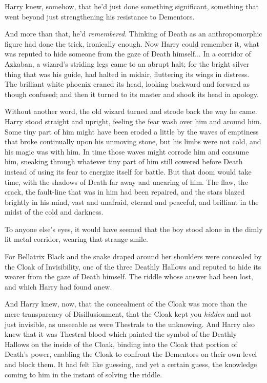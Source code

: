 Harry knew, somehow, that he’d just done something significant, something that went beyond just strengthening his resistance to Dementors.

And more than that, he’d \emph{remembered}. Thinking of Death as an anthropomorphic figure had done the trick, ironically enough. Now Harry could remember it, what was reputed to hide someone from the gaze of Death himself...
\sbreak
In a corridor of Azkaban, a wizard’s striding legs came to an abrupt halt; for the bright silver thing that was his guide, had halted in midair, fluttering its wings in distress. The brilliant white phoenix craned its head, looking backward and forward as though confused; and then it turned to its master and shook its head in apology.

Without another word, the old wizard turned and strode back the way he came.
\sbreak
Harry stood straight and upright, feeling the fear wash over him and around him. Some tiny part of him might have been eroded a little by the waves of emptiness that broke continually upon his unmoving stone, but his limbs were not cold, and his magic was with him. In time those waves might corrode him and consume him, sneaking through whatever tiny part of him still cowered before Death instead of using its fear to energize itself for battle. But that doom would take time, with the shadows of Death far away and uncaring of him. The flaw, the crack, the fault-line that was in him had been repaired, and the stars blazed brightly in his mind, vast and unafraid, eternal and peaceful, and brilliant in the midst of the cold and darkness.

To anyone else’s eyes, it would have seemed that the boy stood alone in the dimly lit metal corridor, wearing that strange smile.

For Bellatrix Black and the snake draped around her shoulders were concealed by the Cloak of Invisibility, one of the three Deathly Hallows and reputed to hide its wearer from the gaze of Death himself. The riddle whose answer had been lost, and which Harry had found anew.

And Harry knew, now, that the concealment of the Cloak was more than the mere transparency of Disillusionment, that the Cloak kept you \emph{hidden} and not just invisible, as unseeable as were Thestrals to the unknowing. And Harry also knew that it was Thestral blood which painted the symbol of the Deathly Hallows on the inside of the Cloak, binding into the Cloak that portion of Death’s power, enabling the Cloak to confront the Dementors on their own level and block them. It had felt like guessing, and yet a certain guess, the knowledge coming to him in the instant of solving the riddle.

